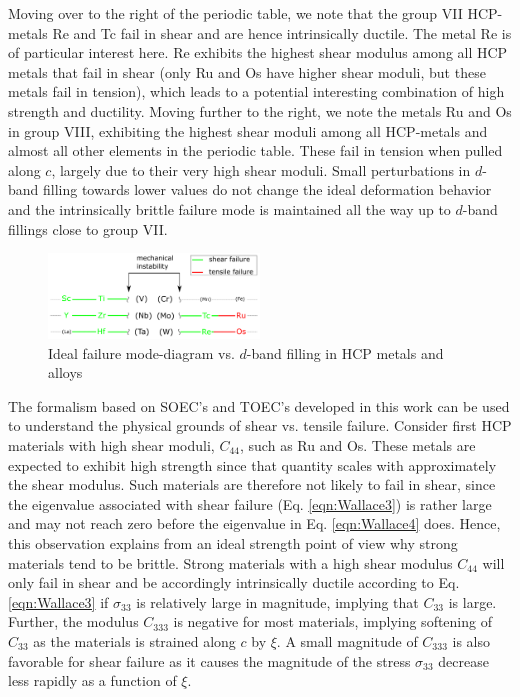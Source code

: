 \documentclass[showpacs,aps,floatfix,prb,reprint,superscriptaddress]{revtex4-1}
\begin{document}
Moving over to the right of the periodic table, we note that the group VII HCP-metals Re and Tc fail in shear and are hence intrinsically ductile. The metal Re is of particular interest here. Re exhibits the highest shear modulus among all HCP metals that fail in shear (only Ru and Os have higher shear moduli, but these metals fail in tension), which leads to a potential interesting combination of high strength and ductility. Moving further to the right, we note the metals Ru and Os in group VIII, exhibiting the highest shear moduli among all HCP-metals and almost all other elements in the periodic table. These fail in tension when pulled along $c$, largely due to their very high shear moduli. Small perturbations in $d$-band filling towards lower values do not change the ideal deformation behavior and the intrinsically brittle failure mode is maintained all the way up to $d$-band fillings close to group VII. \\

\begin{figure}[h!]
\centering
\includegraphics[width=0.50\textwidth]{drawing1.png}
\caption{Ideal failure mode-diagram vs. $d$-band filling in HCP metals and alloys}
\label{fig:sgentwinpic1}
\end{figure}

The formalism based on SOEC's and TOEC's developed in this work can be used to understand the physical grounds of shear vs. tensile failure. Consider first HCP materials with high shear moduli, $C_{44}$, such as Ru and Os. These metals are expected to exhibit high strength since that quantity scales with approximately the shear modulus. Such materials are therefore not likely to fail in shear, since the eigenvalue associated with shear failure (Eq. \ref{eqn:Wallace3}) is rather large and may not reach zero before the eigenvalue in Eq. \ref{eqn:Wallace4} does. Hence, this observation explains from an ideal strength point of view why strong materials tend to be brittle. Strong materials with a high shear modulus $C_{44}$ will only fail in shear and be accordingly intrinsically ductile according to Eq. \ref{eqn:Wallace3} if $\sigma_{33}$ is relatively large in magnitude, implying that $C_{33}$ is large. Further, the modulus $C_{333}$ is negative for most materials, implying softening of $C_{33}$ as the materials is strained along $c$ by $\xi$. A small magnitude of $C_{333}$ is also favorable for shear failure as it causes the magnitude of the stress $\sigma_{33}$ decrease less rapidly as a function of $\xi$. \\
\end{document}
